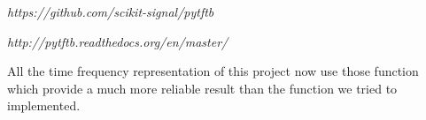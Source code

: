 \medskip

\textit{https://github.com/scikit-signal/pytftb}

\medskip

\textit{http://pytftb.readthedocs.org/en/master/}

\medskip

All the time frequency representation of this project now use those function which provide a much more reliable result than the function we tried to implemented.
